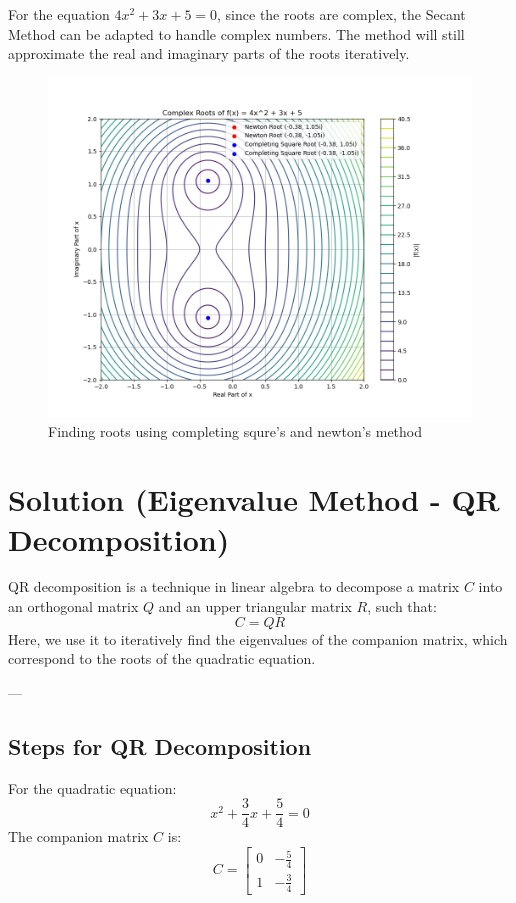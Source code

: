 \documentclass[journal]{IEEEtran}
\begin{document}
For the equation \( 4x^2 + 3x + 5 = 0 \), since the roots are complex, the Secant Method can be adapted to handle complex numbers. The method will still approximate the real and imaginary parts of the roots iteratively.

		\begin{figure}[h!]
		\centering
		\includegraphics[width=\columnwidth]{figs/Fig2.png}
			\caption{Finding roots using completing squre's and newton's method}
		\label{stemplot}
	\end{figure}
\section*{Solution (Eigenvalue Method - QR Decomposition)}

QR decomposition is a technique in linear algebra to decompose a matrix \( C \) into an orthogonal matrix \( Q \) and an upper triangular matrix \( R \), such that:
\[
C = QR
\]
Here, we use it to iteratively find the eigenvalues of the companion matrix, which correspond to the roots of the quadratic equation.

---

\subsection*{Steps for QR Decomposition}


For the quadratic equation:
\[
x^2 + \frac{3}{4}x + \frac{5}{4} = 0
\]
The companion matrix \( C \) is:
\[
C =
\begin{bmatrix}
0 & -\frac{5}{4} \\
1 & -\frac{3}{4}
\end{bmatrix}
\]
\end{document}
